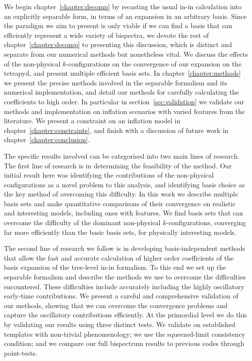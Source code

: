 We begin chapter~\ref{chapter:decomp} by recasting the usual in-in calculation into an explicitly separable form,
in terms of an expansion in an arbitrary basis.
Since the paradigm we aim to present is only viable if we can find a basis
that can efficiently represent a wide variety of bispectra,
we devote the rest of chapter~\ref{chapter:decomp} to presenting this discussion, which is
distinct and separate from our numerical methods but nonetheless vital.
We discuss the effects of the
non-physical $k$-configurations on the convergence of our expansion on
the tetrapyd, and present multiple efficient basis sets.
In chapter~\ref{chapter:methods} we present the precise methods involved in the
separable formalism and its numerical implementation,
and detail our methods for carefully calculating the coefficients to high order.
In particular in section~\ref{sec:validation} we validate our methods and implementation
on inflation scenarios with varied features from the literature.
We present a constraint on an inflation model in chapter~\ref{chapter:constraints},
and finish with a discussion of future work in chapter~\ref{chapter:conclusion}.


The specific results involved can be categorised into two main lines of research.
The first line of research is in determining the feasibility of the method.
Our initial result here was identifying the contributions of the non-physical configurations
as a novel problem to this analysis, and identifying basis choice as the key method of overcoming this difficulty.
In this work we describe multiple basis sets and make quantitative comparisons
of their convergence on realistic and interesting models, including ones with features.
We find basis sets that can overcome the difficulty of the dominant non-physical $k$-configurations,
converging far more efficiently than the basic basis sets, for physically interesting models.


The second line of research we follow is in developing basis-independent methods that allow the fast and accurate calculation
of higher order coefficients of the basis expansion of the tree-level in-in formalism.
To this end we set up the separable formalism and describe the methods we use to overcome the difficulties encountered.
These difficulties include accurately including the highly oscillatory early-time contributions.
We present a careful and comprehensive validation of our methods,
showing that we can overcome the convergence problems and capture the oscillatory contributions efficiently.
At the primordial level we do this by validating our results using three distinct tests.
We validate on established templates with non-trivial
phenomenology; we use the squeezed-limit consistency condition; and we compare our
full bispectrum results to previous codes through point-tests.


